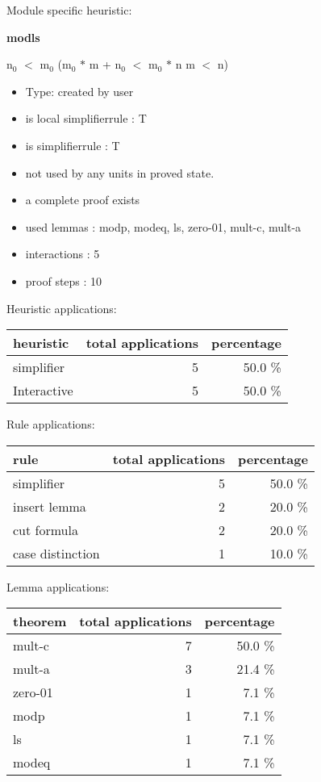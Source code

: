 \documentclass[a4paper]{article}
\begin{document}
Module specific heuristic:

\pagebreak

{\LARGE\bf modls}\label{lemma-modls}

\medskip

 \Fol $\mbox{n}_{0}$ $<$ $\mbox{m}_{0}$ \Imp ($\mbox{m}_{0}$ $*$ m + $\mbox{n}_{0}$ $<$ $\mbox{m}_{0}$ $*$ n \Equiv m $<$ n)

\begin{itemize}

\item Type: created by user

\item is local simplifierrule : T
\item is simplifierrule : T
\item not used by any units in proved state.
\item       a complete proof exists
\item       used lemmas  : modp, modeq, ls, zero-01, mult-c, mult-a
\item       interactions : 5
\item       proof steps  : 10
\end{itemize}

\medskip


Heuristic applications:

\begin{supertabular}{l|r|r}
heuristic	& total applications & percentage \\ \hline
simplifier & 5 & 50.0 \% \\
Interactive & 5 & 50.0 \% \\

\end{supertabular}

Rule applications:

\begin{supertabular}{l|r|r}
rule	        & total applications & percentage \\ \hline
simplifier & 5 & 50.0 \% \\
insert lemma & 2 & 20.0 \% \\
cut formula & 2 & 20.0 \% \\
case distinction & 1 & 10.0 \% \\

\end{supertabular}

Lemma applications:

\begin{supertabular}{l|r|r}
theorem	        & total applications & percentage \\ \hline
mult-c & 7 & 50.0 \% \\
mult-a & 3 & 21.4 \% \\
zero-01 & 1 & 7.1 \% \\
modp & 1 & 7.1 \% \\
ls & 1 & 7.1 \% \\
modeq & 1 & 7.1 \% \\

\end{supertabular}
\end{document}
